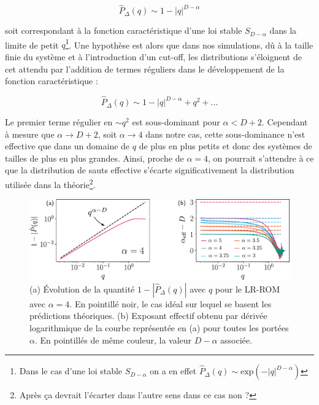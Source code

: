 \begin{equation}
	\hat{P}_\Delta(q) \sim 1-|q|^{D-\alpha}
\end{equation}

\noindent soit correspondant à la fonction caractéristique d'une loi stable $S_{D-\alpha}$ dans la limite de petit $q$\footnote{Dans le cas d'une loi stable $S_{D-\alpha}$ on a en effet $\hat{P}_\Delta(q) \sim \text{exp}\left( -|q|^{D-\alpha} \right)$}. Une hypothèse est alors que dans nos simulations, dû à la taille finie du système et à l'introduction d'un cut-off, les distributions s'éloignent de cet attendu par l'addition de termes réguliers dans le développement de la fonction caractéristique :

\begin{equation}
	\hat{P}_\Delta(q) \sim 1-|q|^{D-\alpha} + q^2 + ...
	\label{eq:DevStable}
\end{equation}

\noindent Le premier terme régulier en $\sim q^2$ est sous-dominant pour $\alpha < D+2$. Cependant à mesure que $\alpha \rightarrow D+2$, soit $\alpha\rightarrow 4$ dans notre cas, cette sous-dominance n'est effective que dans un domaine de $q$ de plus en plus petits et donc des systèmes de tailles de plus en plus grandes. Ainsi, proche de $\alpha = 4$, on pourrait s'attendre à ce que la distribution de sauts effective s'écarte significativement la distribution utilisée dans la théorie\footnote{Après ça devrait l'écarter dans l'autre sens dans ce cas non ?}.

\begin{figure}[h]
	\centering
	\includegraphics[width=\textwidth]{Chapitre2/Figures/Hyperuniformity/GammaEff_ROM.pdf}
	\caption{(a) Évolution de la quantité $1-|\hat{P}_\Delta (q)|$ avec $q$ pour le LR-ROM avec $\alpha=4$. En pointillé noir, le cas idéal sur lequel se basent les prédictions théoriques. (b) Exposant effectif obtenu par dérivée logarithmique de la courbe représentée en (a) pour toutes les portées $\alpha$. En pointillés de même couleur, la valeur $D-\alpha$ associée.}
	\label{fig:GammaEffROM}
\end{figure}

